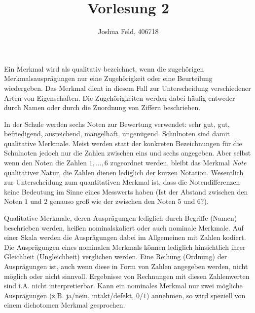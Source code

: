 \documentclass{lecture}
\institute{Institut für Statistik und Wirtschaftsmathematik}
\title{Vorlesung 2}
\author{Joshua Feld, 406718}
\begin{document}
    \maketitle


    Ein Merkmal wird als qualitativ bezeichnet, wenn die zugehörigen Merkmalsausprägungen nur eine Zugehörigkeit oder eine Beurteilung wiedergeben.
    Das Merkmal dient in diesem Fall zur Unterscheidung verschiedener Arten von Eigenschaften.
    Die Zugehörigkeiten werden dabei häufig entweder durch Namen oder durch die Zuordnung von Ziffern beschrieben.

    \begin{example}
        In der Schule werden sechs Noten zur Bewertung verwendet: sehr gut, gut, befriedigend, ausreichend, mangelhaft, ungenügend.
        Schulnoten sind damit qualitative Merkmale.
        Meist werden statt der konkreten Bezeichnungen für die Schulnoten jedoch nur die Zahlen zwischen eins und sechs angegeben.
        Aber selbst wenn den Noten die Zahlen \(1, \ldots, 6\) zugeordnet werden, bleibt das Merkmal \emph{Note} qualitativer Natur, die Zahlen dienen lediglich der kurzen Notation.
        Wesentlich zur Unterscheidung zum quantitativen Merkmal ist, dass die Notendifferenzen keine Bedeutung im Sinne eines Messwerts haben (Ist der Abstand zwischen den Noten \(1\) und \(2\) genauso groß wie der zwischen den Noten \(5\) und \(6\)?).
    \end{example}

    Qualitative Merkmale, deren Ausprägungen lediglich durch Begriffe (Namen) beschrieben werden, heißen nominalskaliert oder auch nominale Merkmale.
    Auf einer Skala werden die Ausprägungen dabei im Allgemeinen mit Zahlen kodiert.
    Die Ausprägungen eines nominalen Merkmals können lediglich hinsichtlich ihrer Gleichheit (Ungleichheit) verglichen werden.
    Eine Reihung (Ordnung) der Ausprägungen ist, auch wenn diese in Form von Zahlen angegeben werden, nicht möglich oder nicht sinnvoll.
    Ergebnisse von Rechnungen mit diesen Zahlenwerten sind i.A. nicht interpretierbar.
    Kann ein nominales Merkmal nur zwei mögliche Ausprägungen (z.B. ja/nein, intakt/defekt, \(0\)/\(1\)) annehmen, so wird speziell von einem dichotomen Merkmal gesprochen.
\end{document}
